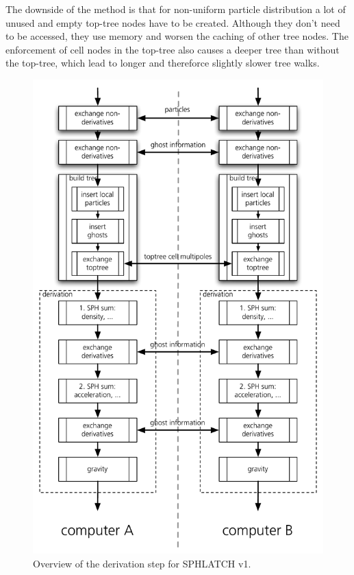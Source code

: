 The downside of the method is that for non-uniform particle distribution a lot of unused and empty top-tree nodes have to be created. Although they don't need to be accessed, they use memory and worsen the caching of other tree nodes. The enforcement of cell nodes in the top-tree also causes a deeper tree than without the top-tree, which lead to longer and thereforce slightly slower tree walks.\\



\begin{figure}[htbp]
\begin{center}
\includegraphics[scale=0.6]{21algo_sphlatch01.pdf}
\caption{Overview of the derivation step for SPHLATCH v1. }
\label{ch02_grav02_fig12}
\end{center}
\end{figure}


